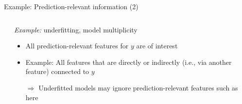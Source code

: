 \documentclass[10pt,compress,t,notes=noshow, xcolor=table]{beamer}
\begin{document}
\begin{frame}{Example: Prediction-relevant information (2)}
\begin{columns}[T, totalwidth=\textwidth]
\begin{column}{0.52\textwidth}
{
}
  \end{column}
  \begin{column}{0.51\textwidth}
  \textit{Example:} underfitting, model multiplicity
  \pause
      \begin{itemize}
      \item All prediction-relevant features for $y$ are of interest
      \item Example: All features that are directly or indirectly (i.e., via another feature) connected to $y$ 
      \item[$\Rightarrow$] Underfitted models may ignore prediction-relevant features such as  here
  \end{itemize}
  \end{column}
\end{columns}
\end{frame}
\end{document}
